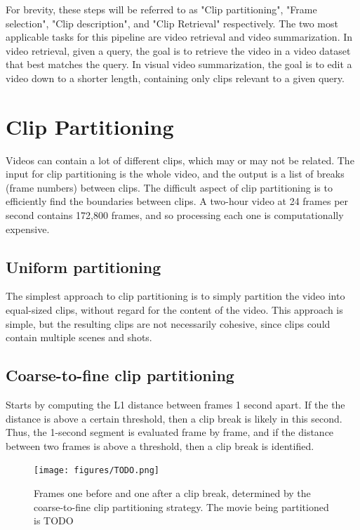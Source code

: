\documentclass{article}
\begin{document}
For brevity, these steps will be referred to as "Clip partitioning", "Frame selection", "Clip description", and "Clip Retrieval" respectively.
The two most applicable tasks for this pipeline are video retrieval and video summarization.
In video retrieval, given a query, the goal is to retrieve the video in a video dataset that best matches the query.
In visual video summarization, the goal is to edit a video down to a shorter length, containing only clips relevant to a given query.



\section{Clip Partitioning}

Videos can contain a lot of different clips, which may or may not be related.
The input for clip partitioning is the whole video, and the output is a list of breaks (frame numbers) between clips.
The difficult aspect of clip partitioning is to efficiently find the boundaries between clips.
A two-hour video at 24 frames per second contains 172,800 frames, and so processing each one is computationally expensive.
\subsection{Uniform partitioning}
The simplest approach to clip partitioning is to simply partition the video into equal-sized clips, without regard for the content of the video.
This approach is simple, but the resulting clips are not necessarily cohesive, since clips could contain multiple scenes and shots.
\subsection{Coarse-to-fine clip partitioning}
Starts by computing the L1 distance between frames 1 second apart.
If the the distance is above a certain threshold, then a clip break is likely in this second.
Thus, the 1-second segment is evaluated frame by frame, and if the distance between two frames is above a threshold, then a clip break is identified.

\begin{figure}
      \centering
      \texttt{[image: figures/TODO.png]}
      \caption{Frames one before and one after a clip break, determined by the coarse-to-fine clip partitioning strategy. The movie being partitioned is TODO}
      \label{fig:optical_flow}
\end{figure}
\end{document}
